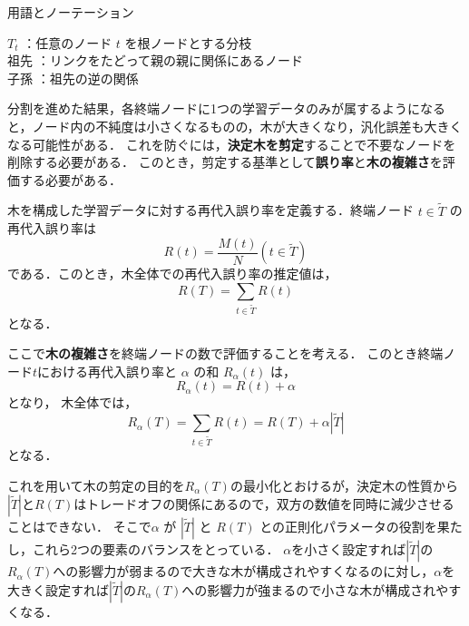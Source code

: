 \documentclass[dvipdfmx]{jreport}
\begin{document}
\begin{itembox}[l]{\large{用語とノーテーション}}
\begin{tabbing}
        \hspace{15pt} \raisebox{0.5ex}{\tiny $\bullet$} $T_t$ \>：任意のノード $t$ を根ノードとする分枝\\[0.5em]
        \hspace{15pt} \raisebox{0.5ex}{\tiny $\bullet$} 祖先 \>：リンクをたどって親の親に関係にあるノード\\[0.5em]
        \hspace{15pt} \raisebox{0.5ex}{\tiny $\bullet$} 子孫 \>：祖先の逆の関係
    \end{tabbing}
\end{itembox}

分割を進めた結果，各終端ノードに1つの学習データのみが属するようになると，ノード内の不純度は小さくなるものの，木が大きくなり，汎化誤差も大きくなる可能性がある．
これを防ぐには，\textbf{決定木を剪定}することで不要なノードを削除する必要がある．
このとき，剪定する基準として\textbf{誤り率}と\textbf{木の複雑さ}を評価する必要がある．

木を構成した学習データに対する再代入誤り率を定義する．終端ノード $t \in \tilde{T}$ の再代入誤り率は
\begin{equation}
    R(t) = \frac{M(t)}{N}(t \in \tilde{T}) \label{eq:10}
\end{equation}
である．このとき，木全体での再代入誤り率の推定値は，
\begin{equation}
    R(T) = \sum_{t\in\tilde{T}}R(t) \label{eq:11}
\end{equation}
となる．

ここで\textbf{木の複雑さ}を終端ノードの数で評価することを考える．
このとき終端ノード$t$における再代入誤り率と $\alpha$ の和 $R_\alpha(t)$ は，
\begin{equation}
    R_\alpha(t) = R(t) + \alpha \label{eq:12}
\end{equation}
となり，
木全体では，
\begin{equation}
    R_\alpha(T) = \sum_{t\in\tilde{T}}R(t) = R(T) + \alpha |\tilde{T}| \label{eq:13}
\end{equation}
となる．

これを用いて木の剪定の目的を$R_\alpha(T)$の最小化とおけるが，決定木の性質から$|\tilde{T}|$と$R(T)$はトレードオフの関係にあるので，双方の数値を同時に減少させることはできない．
そこで$\alpha$ が $|\tilde{T}|$ と $R(T)$ との正則化パラメータの役割を果たし，これら2つの要素のバランスをとっている．
$\alpha$を小さく設定すれば$|\tilde{T}|$の$R_\alpha(T)$への影響力が弱まるので大きな木が構成されやすくなるのに対し，$\alpha$を大きく設定すれば$|\tilde{T}|$の$R_\alpha(T)$への影響力が強まるので小さな木が構成されやすくなる．
\end{document}
